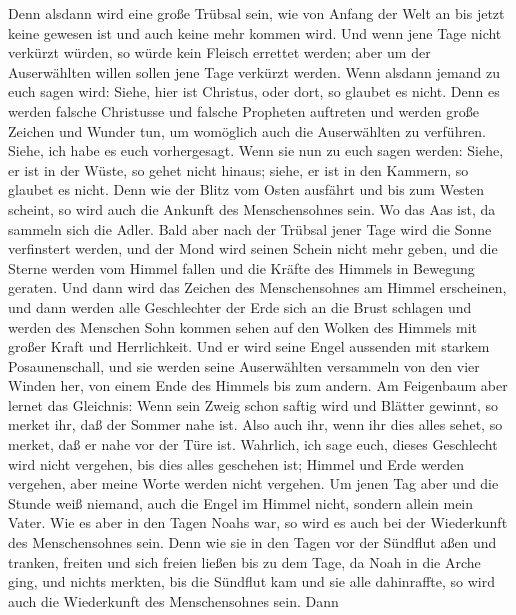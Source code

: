  Denn alsdann wird eine große Trübsal sein, wie von
Anfang der Welt an bis jetzt keine gewesen ist und auch keine mehr
kommen wird.  Und wenn jene Tage nicht verkürzt würden,
so würde kein Fleisch errettet werden; aber um der Auserwählten willen
sollen jene Tage verkürzt werden.  Wenn alsdann jemand zu
euch sagen wird: Siehe, hier ist Christus, oder dort, so glaubet es
nicht.  Denn es werden falsche Christusse und falsche
Propheten auftreten und werden große Zeichen und Wunder tun, um
womöglich auch die Auserwählten zu verführen.  Siehe, ich
habe es euch vorhergesagt.  Wenn sie nun zu euch sagen
werden: Siehe, er ist in der Wüste, so gehet nicht hinaus; siehe, er ist
in den Kammern, so glaubet es nicht.  Denn wie der Blitz
vom Osten ausfährt und bis zum Westen scheint, so wird auch die Ankunft
des Menschensohnes sein.  Wo das Aas ist, da sammeln sich
die Adler.  Bald aber nach der Trübsal jener Tage wird
die Sonne verfinstert werden, und der Mond wird seinen Schein nicht mehr
geben, und die Sterne werden vom Himmel fallen und die Kräfte des
Himmels in Bewegung geraten.  Und dann wird das Zeichen
des Menschensohnes am Himmel erscheinen, und dann werden alle
Geschlechter der Erde sich an die Brust schlagen und werden des Menschen
Sohn kommen sehen auf den Wolken des Himmels mit großer Kraft und
Herrlichkeit.  Und er wird seine Engel aussenden mit
starkem Posaunenschall, und sie werden seine Auserwählten versammeln von
den vier Winden her, von einem Ende des Himmels bis zum andern.
 Am Feigenbaum aber lernet das Gleichnis: Wenn sein Zweig
schon saftig wird und Blätter gewinnt, so merket ihr, daß der Sommer
nahe ist.  Also auch ihr, wenn ihr dies alles sehet, so
merket, daß er nahe vor der Türe ist.  Wahrlich, ich sage
euch, dieses Geschlecht wird nicht vergehen, bis dies alles geschehen
ist;  Himmel und Erde werden vergehen, aber meine Worte
werden nicht vergehen.  Um jenen Tag aber und die Stunde
weiß niemand, auch die Engel im Himmel nicht, sondern allein mein Vater.
 Wie es aber in den Tagen Noahs war, so wird es auch bei
der Wiederkunft des Menschensohnes sein.  Denn wie sie in
den Tagen vor der Sündflut aßen und tranken, freiten und sich freien
ließen bis zu dem Tage, da Noah in die Arche ging,  und
nichts merkten, bis die Sündflut kam und sie alle dahinraffte, so wird
auch die Wiederkunft des Menschensohnes sein.  Dann
